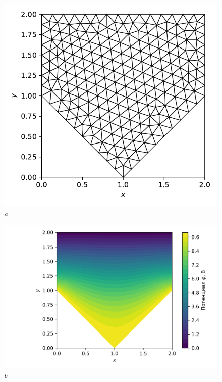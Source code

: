 \documentclass[12pt, a4paper]{article}
\begin{document}
			\begin{figure}[h]       
				\vspace{5.0mm} 
				\begin{center} 
					{ 
						\begin{minipage}{0.47\textwidth} 
							\centering 
							\hspace*{-9.5mm}
							\includegraphics[width=0.99\columnwidth]{Test_domain_4_mesh001_calfem_net.pdf}\\
							\textit{a} 
						\end{minipage}                                 
					} 
					{ 
						\begin{minipage}{0.47\textwidth} 
							\centering 
							\hspace*{-17.5mm}
							\includegraphics[width=1.4\columnwidth]{Test_domain_4_mesh001_calfem.png}\\
							\textit{b} 
						\end{minipage}                                 
					} 
					

\end{center}
\end{figure}
\end{document}
